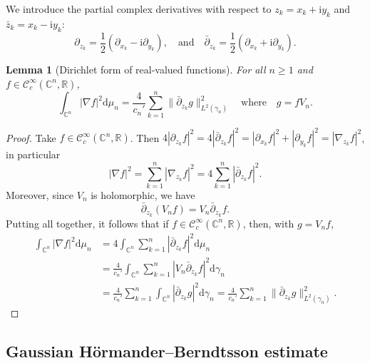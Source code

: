 \documentclass[11pt,reqno]{amsart}
\numberwithin{equation}{section}%
\numberwithin{figure}{section}%
\numberwithin{table}{section}
\theoremstyle{plain}
\newtheorem{lemma}[theorem]{Lemma}
\theoremstyle{definition}
\begin{document}
We introduce the partial complex derivatives with respect to
$z_k=x_k+\mathrm{i}y_k$ and $\bar z_k=x_k-\mathrm{i}y_k$:
\begin{equation}\label{eq:complex-derivatives}
  \partial_{z_k}=\frac12(\partial_{x_k}-\mathrm{i}\partial_{y_k}),
  \quad\text{and}\quad
  \bar\partial_{z_k}=\frac12(\partial_{x_k}+\mathrm{i}\partial_{y_k}).
\end{equation}

\begin{lemma}[Dirichlet form of real-valued functions]\label{le:grad}
  For all $n\geq1$ and $f\in\mathcal{C}^\infty_c(\mathbb{C}^n,\mathbb{R})$,
  \begin{equation}
    \int_{\mathbb{C}^n}|\nabla f|^2\mathrm{d}\mu_n
    =\frac{4}{c_n'}\sum_{k=1}^n\|\bar\partial_{z_k}g\|_{L^2(\gamma_n)}^2
    \quad\text{where}\quad
    g=fV_n.\label{eq:trans}
  \end{equation}
\end{lemma}

\begin{proof}
  Take $f\in\mathcal{C}^\infty_c(\mathbb{C}^n,\mathbb{R})$. Then
  $4|\partial_{z_k}f|^2=4|\bar\partial_{z_k}f|^2=|\partial_{x_k}f|^2+|\partial_{y_k}f|^2=|\nabla_{z_k}f|^2$,
  in particular
  \begin{equation}\label{eq:real-gradient}
    |\nabla f|^2=\sum_{k=1}^n|\nabla_{z_k}f|^2=4\sum_{k=1}^n |\bar\partial_{z_k}f|^2.
  \end{equation}
  Moreover, since $V_n$ is holomorphic, we have
  \begin{equation}\label{eq:dbar-vand}
    \bar\partial_{z_k}(V_n f)=V_n\bar\partial_{z_k}f.
  \end{equation}
  Putting all together, it follows that if
  $f\in\mathcal{C}^\infty_c(\mathbb{C}^n,\mathbb{R})$, then, with $g=V_nf$,
  \begin{align}
    \int_{\mathbb{C}^n}|\nabla f|^2\mathrm{d}\mu_n
    &=4\int_{\mathbb{C}^n}\sum_{k=1}^n|\bar\partial_{z_k} f|^2\mathrm{d}\mu_n\\
    &=\frac{4}{c_n'}\int_{\mathbb{C}^n}\sum_{k=1}^n|V_n\bar\partial_{z_k}f|^2\mathrm{d}\gamma_n\\
    &=\frac{4}{c_n'}\sum_{k=1}^n\int_{\mathbb{C}^n}|\bar\partial_{z_k}g|^2\mathrm{d}\gamma_n
      =\frac{4}{c_n'}\sum_{k=1}^n\|\bar\partial_{z_k}g\|_{L^2(\gamma_n)}^2.%
  \end{align}
\end{proof}

\subsection{Gaussian Hörmander--Berndtsson estimate}
\end{document}
